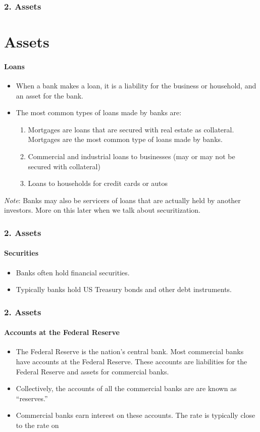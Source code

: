 \documentclass{beamer}
\begin{document}
\begin{frame}[t]
    \frametitle{2. Assets}
    \section{Assets}
    \framesubtitle{Loans}

    \begin{itemize}
        \item When a bank makes a loan, it is a liability for the business or household, and an asset for the bank.
        \item The most common types of loans made by banks are:
        \begin{enumerate}
            \item Mortgages are loans that are secured with real estate as collateral.   Mortgages are the most common type of loans made by banks.
            \item Commercial and industrial loans to businesses (may or may not be secured with collateral)
            \item Loans to households for credit cards or autos
        \end{enumerate}
    \end{itemize}

    \vspace{1em}
    
    \textit{Note}: Banks may also be servicers of loans that are actually held by another investors.   More on this later when we talk about securitization.

\end{frame}

\begin{frame}[t]
    \frametitle{2. Assets}
    \framesubtitle{Securities}

    \begin{itemize}
        \item Banks often hold financial securities.
        \item Typically banks hold US Treasury bonds and other debt instruments.
    \end{itemize}
    
\end{frame}

\begin{frame}[t]
    \frametitle{2. Assets}
    \framesubtitle{Accounts at the Federal Reserve}
    
    \begin{itemize}
        \item The Federal Reserve is the nation’s central bank.   Most commercial banks have accounts at the Federal Reserve.   These accounts are liabilities for the Federal Reserve and assets for commercial banks.
        \item Collectively, the accounts of all the commercial banks are are known as “reserves.”
        \item Commercial banks earn interest on these accounts.   The rate is typically close to the rate on
    \end{itemize}

\end{frame}
\end{document}

